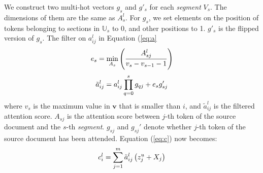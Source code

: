 We construct two multi-hot vectors $g_{s}$ and $g'_{s}$ for each \textit{segment} $V_{s}$.
The dimensions of them are the
same as $A_{s}^{l}$. For $g_{s}$, we set elements on the position of tokens
belonging to sections in $\mathbb{U}_{s}$ to 0, and other
positions to 1. $g'_{s}$ is the flipped version of $g_{s}$. 
The filter on $a_{ij}^{l}$ in Equation (\ref{eq:a}\DIFdelbegin {}\DIFdelend \DIFaddbegin {}\DIFaddend %
\begin{equation}
\small
    e_{s} = \min \limits_{A_{s}}\left(\frac{A_{sj}^{l}}{v_{s}-v_{s-1}-1}\right)
\end{equation}
\begin{equation}
\small
    \tilde{a}_{ij}^{l} = a_{ij}^{l}\prod_{q=0}^{s}g_{qj} + e_{s}g_{sj}'
\end{equation}
where $v_{s}$ is the maximum value in 
$\mathbf{v}$ that is smaller than $i$, and $\tilde{a}_{ij}^l$ is the filtered
attention score. $A_{sj}$ is the attention score between $j$-th token
of the source document and the $s$-th \textit{segment}. 
$g_{sj}$ and $g_{sj}'$ denote whether $j$-th token
of the source document has been attended.
Equation (\ref{eq:c}) now becomes:
\begin{equation}
\small
    c _ { i } ^ { l } = \sum _ { j = 1 } ^ { m } \tilde{a}_{ij}^{l} \left( z _ { j } ^ { u } + X_j \right)
\end{equation}



